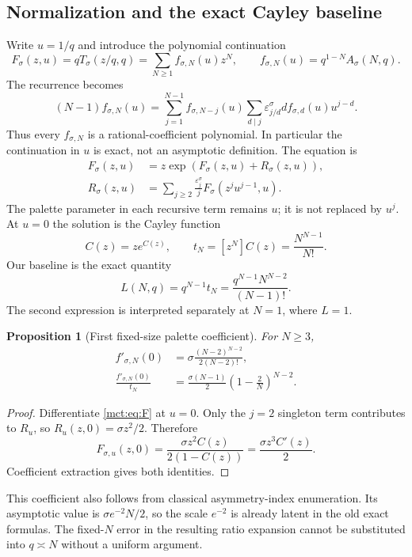 \documentclass[11pt]{article}
\newtheorem{proposition}[theorem]{Proposition}
\theoremstyle{definition}
\newcommand{\Cay}{C}
\newcommand{\eps}{\varepsilon}
\begin{document}
\subsection{Normalization and the exact Cayley baseline}
Write $u=1/q$ and introduce the polynomial continuation
\begin{equation}\label{mct:eq:Fdef}
 F_\sigma(z,u)=qT_\sigma(z/q,q)=\sum_{N\ge1} f_{\sigma,N}(u)z^N,
 \qquad f_{\sigma,N}(u)=q^{1-N}A_\sigma(N,q).
\end{equation}
The recurrence becomes
\begin{equation}\label{mct:eq:frec}
 (N-1)f_{\sigma,N}(u)=\sum_{j=1}^{N-1}f_{\sigma,N-j}(u)
       \sum_{d\mid j}\eps_{j/d}^\sigma d f_{\sigma,d}(u)u^{j-d}.
\end{equation}
Thus every $f_{\sigma,N}$ is a rational-coefficient polynomial. In particular the continuation in $u$ is exact, not an asymptotic definition. The equation is
\begin{align}
 F_\sigma(z,u)&=z\exp(F_\sigma(z,u)+R_\sigma(z,u)),\label{mct:eq:F}\\
 R_\sigma(z,u)&=\sum_{j\ge2}\frac{\eps_j^\sigma}{j}
          F_\sigma(z^ju^{j-1},u).\label{mct:eq:R}
\end{align}
The palette parameter in each recursive term remains $u$; it is not replaced by $u^j$.
At $u=0$ the solution is the Cayley function
\[
 \Cay(z)=z e^{\Cay(z)},\qquad
 t_N=[z^N]\Cay(z)=\frac{N^{N-1}}{N!}.
\]
Our baseline is the exact quantity
\begin{equation}\label{mct:eq:L}
 L(N,q)=q^{N-1}t_N=\frac{q^{N-1}N^{N-2}}{(N-1)!}.
\end{equation}
The second expression is interpreted separately at $N=1$, where $L=1$.

\begin{proposition}[First fixed-size palette coefficient]\label{mct:prop:firstpalette}
For $N\ge3$,
\begin{align}
 f'_{\sigma,N}(0)&=\sigma\frac{(N-2)^{N-2}}{2(N-2)!},\label{mct:eq:firstexact}\\
 \frac{f'_{\sigma,N}(0)}{t_N}
 &=\frac{\sigma(N-1)}2\left(1-\frac2N\right)^{N-2}.
\end{align}
\end{proposition}
\begin{proof}
Differentiate \eqref{mct:eq:F} at $u=0$. Only the $j=2$ singleton term contributes to $R_u$, so $R_u(z,0)=\sigma z^2/2$. Therefore
\[
 F_{\sigma,u}(z,0)=\frac{\sigma z^2\Cay(z)}{2(1-\Cay(z))}
 =\frac{\sigma z^3\Cay'(z)}2.
\]
Coefficient extraction gives both identities.
\end{proof}
This coefficient also follows from classical asymmetry-index enumeration. Its asymptotic value is $\sigma e^{-2}N/2$, so the scale $e^{-2}$ is already latent in the old exact formulas. The fixed-$N$ error in the resulting ratio expansion cannot be substituted into $q\asymp N$ without a uniform argument.
\end{document}
